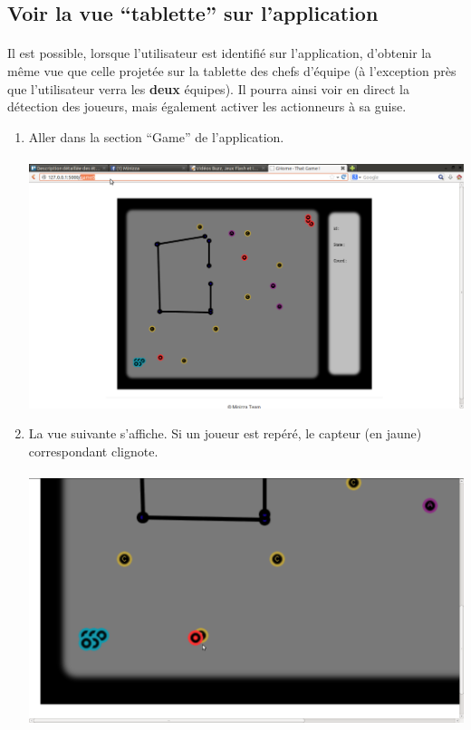 \subsection{Voir la vue ``tablette'' sur l'application}
\paragraph{} Il est possible, lorsque l'utilisateur est identifié sur l'application, d'obtenir la même vue que celle projetée sur la tablette des chefs d'équipe (à l'exception près que l'utilisateur verra les \textbf{deux} équipes). Il pourra ainsi voir en direct la détection des joueurs, mais également activer les actionneurs à sa guise.\\

\begin{enumerate}
 \item Aller dans la section ``Game'' de l'application.\\
 ~~\\
  \includegraphics[scale=0.22]{image/surGame}
 \item La vue suivante s'affiche. Si un joueur est repéré, le capteur (en jaune) correspondant clignote.\\
 ~~\\
 \includegraphics[scale=0.22]{image/captGame}

\end{enumerate}
